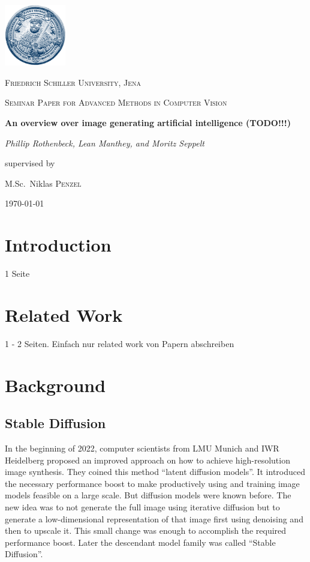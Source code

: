 \documentclass[11pt]{article}
\begin{document}
\begin{titlepage}
    \centering
    \includegraphics[width=0.2\textwidth]{assets/uni-logo.png}\par\vspace{0.5cm}
    {\scshape\LARGE Friedrich Schiller University, Jena \par}
    \vspace{1cm}
    {\scshape\Large Seminar Paper for Advanced Methods in Computer Vision\par}
    \vspace{1.5cm}
    {\huge\bfseries An overview over image generating artificial intelligence (TODO!!!)\par}
    \vspace{2cm}
    {\Large\itshape Phillip Rothenbeck, Lean Manthey, and Moritz Seppelt\par}
    \vfill
    supervised by\par
    M.Sc.~Niklas \textsc{Penzel}

    \vfill

    {\large \today\par}
\end{titlepage}

\tableofcontents
\newpage

\section{Introduction}
1 Seite

\section{Related Work}
1 - 2 Seiten. Einfach nur related work von Papern abschreiben



\section{Background}
\subsection{Stable Diffusion}
\label{heading:subsection:stable_diffusion}
In the beginning of 2022, computer scientists from LMU Munich and IWR Heidelberg proposed an improved approach on how to achieve high-resolution image synthesis\cite{rombach2022stablediffusion}. They coined this method “latent diffusion models”. It introduced the necessary performance boost to make productively using and training image models feasible on a large scale. But diffusion models were known before. The new idea was to not generate the full image using iterative diffusion but to generate a low-dimensional representation of that image first using denoising and then to upscale it. This small change was enough to accomplish the required performance boost. Later the descendant model family was called “Stable Diffusion”.
\end{document}
